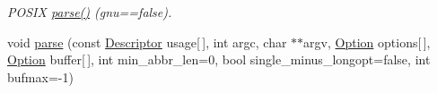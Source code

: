 \begin{DoxyCompactItemize}
\begin{DoxyCompactList}\small\item\em P\+O\+S\+I\+X \hyperlink{classxmem_1_1config_1_1third__party_1_1_parser_a0e45d97675bc5d003ef6f68ac8cd7249}{parse()} (gnu==false). \end{DoxyCompactList}\item 
\hypertarget{classxmem_1_1config_1_1third__party_1_1_parser_ac8d38fe3a923e2336ce610455aefb69b}{}void \hyperlink{classxmem_1_1config_1_1third__party_1_1_parser_ac8d38fe3a923e2336ce610455aefb69b}{parse} (const \hyperlink{structxmem_1_1config_1_1third__party_1_1_descriptor}{Descriptor} usage\mbox{[}$\,$\mbox{]}, int argc, char $\ast$$\ast$argv, \hyperlink{classxmem_1_1config_1_1third__party_1_1_option}{Option} options\mbox{[}$\,$\mbox{]}, \hyperlink{classxmem_1_1config_1_1third__party_1_1_option}{Option} buffer\mbox{[}$\,$\mbox{]}, int min\+\_\+abbr\+\_\+len=0, bool single\+\_\+minus\+\_\+longopt=false, int bufmax=-\/1)\label{classxmem_1_1config_1_1third__party_1_1_parser_ac8d38fe3a923e2336ce610455aefb69b}


\end{DoxyCompactItemize}
